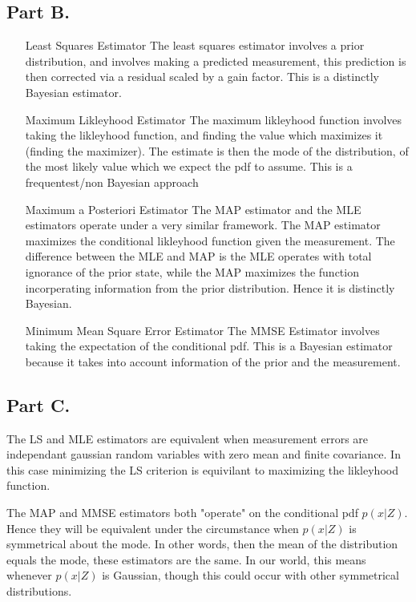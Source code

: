 \documentclass{article}
\begin{document}
\subsection*{Part B.}
\begin{enumerate}
\item[Least Squares Estimator] The least squares estimator involves a prior distribution, and involves making a predicted measurement, this prediction is then corrected via a residual scaled by a gain factor. This is a distinctly Bayesian estimator.
\item[Maximum Likleyhood Estimator] The maximum likleyhood function involves taking the likleyhood function, and finding the value which maximizes it (finding the maximizer). The estimate is then the mode of the distribution, of the most likely value which we expect the pdf to assume. This is a frequentest/non Bayesian approach
\item[Maximum a Posteriori Estimator] The MAP estimator and the MLE estimators operate under a very similar framework. The MAP estimator maximizes the conditional likleyhood function given the measurement. The difference between the MLE and MAP is the MLE operates with total ignorance of the prior state, while the MAP maximizes the function incorperating information from the prior distribution. Hence it is distinctly Bayesian.
\item[Minimum Mean Square Error Estimator] The MMSE Estimator involves taking the expectation of the conditional pdf. This is a Bayesian estimator because it takes into account information of the prior and the measurement.
\end{enumerate}
\subsection*{Part C.}

	The LS and MLE estimators are equivalent when measurement errors are independant gaussian random variables with zero mean and finite covariance. In this case minimizing the LS criterion is equivilant to maximizing the likleyhood function.

The MAP and MMSE estimators both "operate" on the conditional pdf $p(x|Z)$. Hence they will be equivalent under the circumstance when $p(x|Z)$ is symmetrical about the mode. In other words, then the mean of the distribution equals the mode, these estimators are the same. In our world, this means whenever $p(x|Z)$ is Gaussian, though this could occur with other symmetrical distributions.
\end{document}
